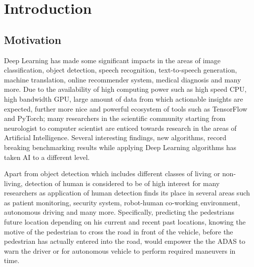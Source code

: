 \pagestyle{fancy}
\fancyhf{}
\fancyhead[EL]{\leftmark} %
\fancyhead[OL]{\leftmark}
\fancyhead[ER,OR]{\thepage}

\setcounter{page}{1}

\chapter{Introduction}
\section{Motivation}
Deep Learning has made some significant impacts in the areas of image classification, 
object detection, speech recognition, text-to-speech generation, machine translation,
online recommender system, medical diagnosis and many more. Due to the availability of high 
computing power such as high speed CPU, high bandwidth GPU, large amount of 
data from which actionable insights are expected, further more nice and powerful ecosystem of  
tools such as TensorFlow and PyTorch; many researchers in the scientific community 
starting from neurologist to computer scientist are enticed towards research in the areas 
of Artificial Intelligence. Several interesting findings, new algorithms, record 
breaking benchmarking results while applying Deep Learning algorithms has taken 
AI to a different level.

\newpara Apart from object detection which includes different classes of living or non-living, detection of human is considered to be of high interest for many researchers as application of human detection finds its place in several areas such as patient monitoring, security system, robot-human co-working environment, autonomous driving and many more. Specifically, predicting the pedestrians future 
location depending on his current and recent past locations, knowing the motive of the pedestrian to cross the road in front of the vehicle, before the pedestrian has actually entered into the road, would empower the the ADAS to warn the driver or for autonomous vehicle to perform required maneuvers in time.

